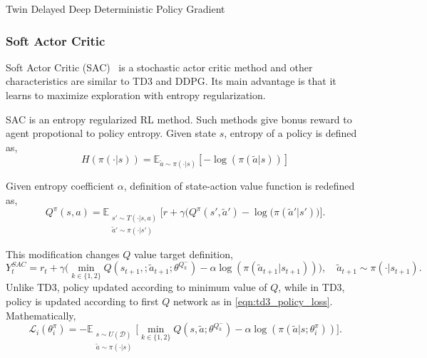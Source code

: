\begin{algorithm}
{{			
		}
	}
	\caption{Twin Delayed Deep Deterministic Policy Gradient}
	\label{alg:td3}
\end{algorithm}


\subsubsection{Soft Actor Critic}
Soft Actor Critic (SAC)~\cite{haarnoja_soft_2018} is a stochastic actor critic method and other characteristics are similar to TD3 and DDPG. Its main advantage is that it learns to maximize exploration with entropy regularization. 

SAC is an entropy regularized RL method. Such methods give bonus reward to agent propotional to policy entropy. Given state $s$, entropy of a policy is defined as,
\begin{equation}
\label{eqn:policy_entropy}
H(\pi(\cdot|s)) = \mathbb{E}_{\widetilde{a}\sim\pi(\cdot|s)}[-\log(\pi(\widetilde{a}|s))]
\end{equation}

Given entropy coefficient $\alpha$, definition of state-action value function is redefined as,
\begin{equation}
\label{eqn:q_dfn_entreg}
Q^{\pi}(s,a) = \mathbb{E}_{\substack{s'\sim T(\cdot|s,a)\\\widetilde{a}'\sim \pi(\cdot|s')} } \Big[r + \gamma \Big(Q^{\pi}(s',\widetilde{a}') -\log(\pi(\widetilde{a}'|s') \Big) \Big]. %
\end{equation}

This modification changes $Q$ value target definition,
\begin{equation}
\label{eqn:q_target_sac}
Y_t^{SAC} = r_t + \gamma \Big(\min_{k\in\{1,2\}} Q(s_{t+1}, ;\widetilde{a}_{t+1};\theta^{Q_k^-}) -\alpha\log(\pi(\widetilde{a}_{t+1}|s_{t+1})) \Big), \quad \widetilde{a}_{t+1} \sim \pi(\cdot|s_{t+1}).
\end{equation}
Unlike TD3, policy updated according to minimum value of $Q$, while in TD3, policy is updated according to first $Q$ network as in \eqref{eqn:td3_policy_loss}. Mathematically, 
\begin{equation}
\label{eqn:sac_policy_loss}
\mathcal{L}_i(\theta^\pi_i) = - \mathbb{E}_{\substack{s \sim U(\mathcal{D})\\\widetilde{a} \sim \pi(\cdot|s)}} \Big[ \min_{k\in\{1,2\}} Q(s, \widetilde{a};\theta^{Q_k^-}) - \alpha\log(\pi(\widetilde{a}|s;\theta^\pi_i)) \Big].
\end{equation}

